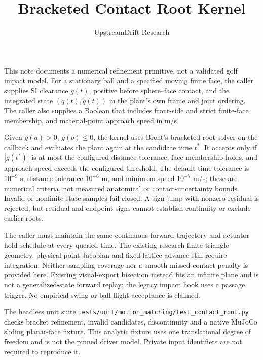 \documentclass{article}
\begin{document}
\title{Bracketed Contact Root Kernel}
\author{UpstreamDrift Research}
\date{}
\maketitle
This note documents a numerical refinement primitive, not a validated golf
impact model.  For a stationary ball and a specified moving finite face, the
caller supplies SI clearance $g(t)$, positive before sphere--face contact,
and the integrated state $(q(t),\dot q(t))$ in the plant's own frame and
joint ordering.  The caller also supplies a Boolean that includes front-side
and strict finite-face membership, and material-point approach speed in m/s.

Given $g(a)>0$, $g(b)\leq0$, the kernel uses Brent's bracketed root solver
on the callback and evaluates the plant again at the candidate time $t^*$.
It accepts only if $|g(t^*)|$ is at most the configured distance tolerance,
face membership holds, and approach speed exceeds the configured threshold.
The default time tolerance is $10^{-9}$ s, distance tolerance $10^{-6}$ m,
and minimum speed $10^{-7}$ m/s; these are numerical criteria, not measured
anatomical or contact-uncertainty bounds.  Invalid or nonfinite state samples
fail closed. A sign jump with nonzero residual is rejected, but residual and
endpoint signs cannot establish continuity or exclude earlier roots.

The caller must maintain the same continuous forward trajectory and actuator
hold schedule at every queried time. The existing research finite-triangle
geometry, physical point Jacobian and fixed-lattice advance still require
integration. Neither sampling coverage nor a smooth missed-contact penalty is
provided here. Existing visual-export bisection instead fits an infinite plane
and is not a generalized-state forward replay; the legacy impact hook uses a
passage trigger. No empirical swing or ball-flight acceptance is claimed.

The headless unit suite \texttt{tests/unit/motion\_matching/test\_contact\_root.py}
checks bracket refinement, invalid candidates, discontinuity and a native
MuJoCo sliding planar-face fixture. This analytic fixture uses one translational
degree of freedom and is not the pinned driver model. Private input identifiers
are not required to reproduce it.
\end{document}
